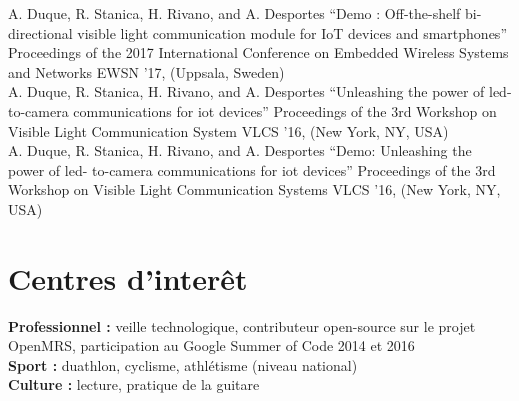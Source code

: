 \documentclass[]{cv-style}          %
\begin{document}
\normalsize
\begin{publist}
\pub
{A. Duque, R. Stanica, H. Rivano, and A. Desportes}
{“Demo : Off-the-shelf bi-directional visible light communication module for IoT devices and smartphones”}
{Proceedings of the 2017 International Conference on Embedded Wireless Systems and Networks}
{EWSN ’17, (Uppsala, Sweden)}\\
\pub
  {A. Duque, R. Stanica, H. Rivano, and A. Desportes}
  {“Unleashing the power of led- to-camera communications for iot devices”}
  {Proceedings of the 3rd Workshop on Visible Light Communication System}
  {VLCS ’16, (New York, NY, USA)}\\
\pub
  {A. Duque, R. Stanica, H. Rivano, and A. Desportes} {“Demo: Unleashing the power of led- to-camera communications for iot devices”} {Proceedings of the 3rd Workshop on Visible Light Communication Systems} {VLCS ’16, (New York, NY, USA)}

\end{publist}


\section{Centres d'interêt}
  \vspace{-0.2cm}
  
\textbf{Professionnel :} veille technologique,  contributeur open-source sur le projet OpenMRS, participation au Google Summer of Code 2014 et 2016 \\
\textbf{Sport :} duathlon, cyclisme, athlétisme (niveau national) \\
\textbf{Culture :} lecture, pratique de la guitare
\end{document}
